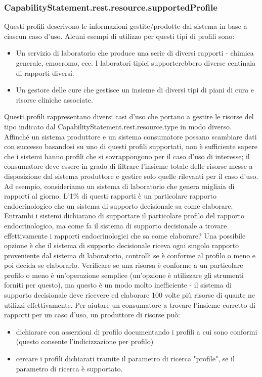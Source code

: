 \documentclass{article}
\begin{document}
\subsubsection{CapabilityStatement.rest.resource.supportedProfile}
Questi profili descrivono le informazioni gestite/prodotte dal sistema in base a ciascun caso d'uso. Alcuni esempi di utilizzo per questi tipi di profili sono:
\begin{itemize}
    \item Un servizio di laboratorio che produce una serie di diversi rapporti - chimica generale, emocromo, ecc. I laboratori tipici supporterebbero diverse centinaia di rapporti diversi.
    \item Un gestore delle cure che gestisce un insieme di diversi tipi di piani di cura e risorse cliniche associate.
\end{itemize}
Questi profili rappresentano diversi casi d'uso che portano a gestire le risorse del tipo indicato dal CapabilityStatement.rest.resource.type in modo diverso.
Affinché un sistema produttore e un sistema consumatore possano scambiare dati con successo basandosi su uno di questi profili supportati, non è sufficiente sapere che i sistemi hanno profili
che si sovrappongono per il caso d'uso di interesse; il consumatore deve essere in grado di filtrare l'insieme totale delle risorse messe a disposizione dal sistema produttore e gestire solo
quelle rilevanti per il caso d'uso.
Ad esempio, consideriamo un sistema di laboratorio che genera migliaia di rapporti al giorno. L'1\%  di questi rapporti è un particolare rapporto endocrinologico
che un sistema di supporto decisionale sa come elaborare. Entrambi i sistemi dichiarano di supportare il particolare profilo del rapporto endocrinologico, ma come
fa il sistema di supporto decisionale a trovare effettivamente i rapporti endocrinologici che sa come elaborare?
Una possibile opzione è che il sistema di supporto decisionale riceva ogni singolo rapporto proveniente dal sistema di laboratorio, controlli se è conforme al profilo o meno
e poi decida se elaborarlo. Verificare se una risorsa è conforme a un particolare profilo o meno è un'operazione semplice (un'opzione è utilizzare gli strumenti forniti per questo),
ma questo è un modo molto inefficiente - il sistema di supporto decisionale deve ricevere ed elaborare 100 volte più risorse di quante ne utilizzi effettivamente.
Per aiutare un consumatore a trovare l'insieme corretto di rapporti per un caso d'uso, un produttore di risorse può:
\begin{itemize}
    \item dichiarare con asserzioni di profilo documentando i profili a cui sono conformi (questo consente l'indicizzazione per profilo)
    \item cercare i profili dichiarati tramite il parametro di ricerca "profile", se il parametro di ricerca è supportato.
\end{itemize}
\end{document}
